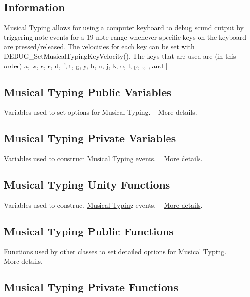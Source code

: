 \hypertarget{group___mus_typ_DocMusTypInfo}{}\subsection{Information}\label{group___mus_typ_DocMusTypInfo}
Musical Typing allows for using a computer keyboard to debug sound output by triggering note events for a 19-\/note range whenever specific keys on the keyboard are pressed/released. The velocities for each key can be set with D\+E\+B\+U\+G\+\_\+\+Set\+Musical\+Typing\+Key\+Velocity(). The keys that are used are (in this order) a, w, s, e, d, f, t, g, y, h, u, j, k, o, l, p, ;, \textquotesingle{}, and \mbox{]}\hypertarget{group___mus_typ_musvar}{}\subsection{Musical Typing Public Variables}\label{group___mus_typ_musvar}
Variables used to set options for \hyperlink{group___mus_typ}{Musical Typing}. ~\newline
 \hyperlink{group___mus_typ_pub_var}{More details}.\hypertarget{group___mus_typ_musprivvar}{}\subsection{Musical Typing Private Variables}\label{group___mus_typ_musprivvar}
Variables used to construct \hyperlink{group___mus_typ}{Musical Typing} events. ~\newline
 \hyperlink{group___mus_typ_priv_var}{More details}.\hypertarget{group___mus_typ_mustypunit}{}\subsection{Musical Typing Unity Functions}\label{group___mus_typ_mustypunit}
Variables used to construct \hyperlink{group___mus_typ}{Musical Typing} events. ~\newline
 \hyperlink{group___mus_typ_unity}{More details}.\hypertarget{group___mus_typ_muspubfunc}{}\subsection{Musical Typing Public Functions}\label{group___mus_typ_muspubfunc}
Functions used by other classes to set detailed options for \hyperlink{group___mus_typ}{Musical Typing}. ~\newline
 \hyperlink{group___mus_typ_pub_func}{More details}.\hypertarget{group___mus_typ_musprivfunc}{}\subsection{Musical Typing Private Functions}\label{group___mus_typ_musprivfunc}
